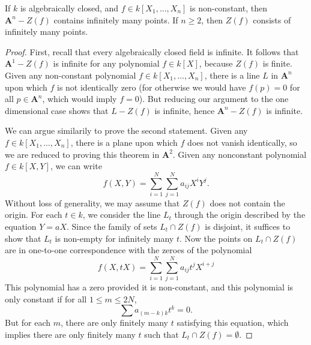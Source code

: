 \begin{prop}
    If $k$ is algebraically closed, and $f \in k[X_1,\dots,X_n]$ is non-constant, then $\mathbf{A}^n - Z(f)$ contains infinitely many points. If $n \geq 2$, then $Z(f)$ consists of infinitely many points.
\end{prop}
\begin{proof}
    First, recall that every algebraically closed field is infinite. It follows that $\mathbf{A}^1 - Z(f)$ is infinite for any polynomial $f \in k[X]$, because $Z(f)$ is finite. Given any non-constant polynomial $f \in k[X_1,\dots,X_n]$, there is a line $L$ in $\mathbf{A}^n$ upon which $f$ is not identically zero (for otherwise we would have $f(p) = 0$ for all $p \in \mathbf{A}^n$, which would imply $f = 0$). But reducing our argument to the one dimensional case shows that $L - Z(f)$ is infinite, hence $\mathbf{A}^n - Z(f)$ is infinite.

    We can argue similarily to prove the second statement. Given any $f \in k[X_1,\dots,X_n]$, there is a plane upon which $f$ does not vanish identically, so we are reduced to proving this theorem in $\mathbf{A}^2$. Given any nonconstant polynomial $f \in k[X,Y]$, we can write
    \[ f(X,Y) = \sum_{i = 1}^N \sum_{j = 1}^N a_{ij} X^i Y^j. \]
    Without loss of generality, we may assume that $Z(f)$ does not contain the origin. For each $t \in k$, we consider the line $L_t$ through the origin described by the equation $Y = aX$. Since the family of sets $L_t \cap Z(f)$ is disjoint, it suffices to show that $L_t$ is non-empty for infinitely many $t$. Now the points on $L_t \cap Z(f)$ are in one-to-one correspondence with the zeroes of the polynomial
    \[ f(X,tX) = \sum_{i = 1}^N \sum_{j = 1}^N a_{ij} t^j X^{i+j} \]
    This polynomial has a zero provided it is non-constant, and this polynomial is only constant if for all $1 \leq m \leq 2N$,
    \[ \sum a_{(m-k)k} t^k = 0. \]
    But for each $m$, there are only finitely many $t$ satisfying this equation, which implies there are only finitely many $t$ such that $L_t \cap Z(f) = \emptyset$.
\end{proof}

